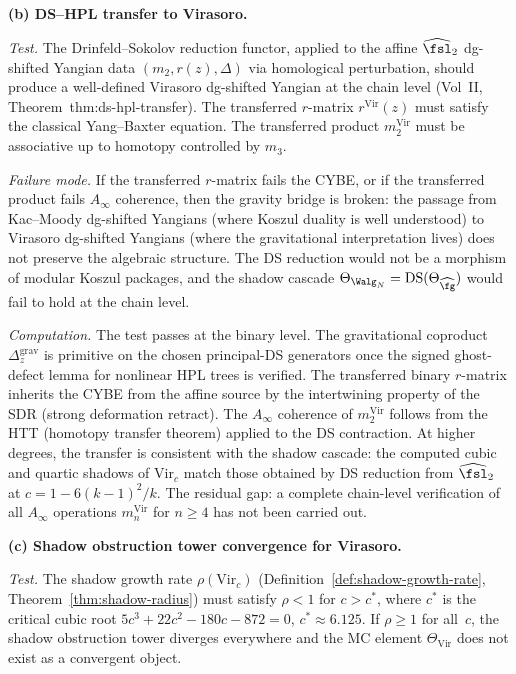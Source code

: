 \medskip
\noindent
\textbf{(b) DS--HPL transfer to Virasoro.}

\smallskip\noindent
\emph{Test.}\enspace
The Drinfeld--Sokolov reduction functor, applied to the
affine $\widehat{\fsl}_2$ dg-shifted Yangian data
$(m_2, r(z), \Delta)$ via homological perturbation,
should produce a well-defined Virasoro dg-shifted Yangian
at the chain level
(Vol~II, Theorem~\textup{thm:ds-hpl-transfer}).
The transferred $r$-matrix $r^{\mathrm{Vir}}(z)$
must satisfy the classical Yang--Baxter equation.
The transferred product $m_2^{\mathrm{Vir}}$ must
be associative up to homotopy controlled by $m_3$.

\smallskip\noindent
\emph{Failure mode.}\enspace
If the transferred $r$-matrix fails the CYBE, or if
the transferred product fails $A_\infty$ coherence,
then the gravity bridge is broken:
the passage from Kac--Moody dg-shifted Yangians
(where Koszul duality is well understood)
to Virasoro dg-shifted Yangians
(where the gravitational interpretation lives)
does not preserve the algebraic structure.
The DS reduction would not be a morphism of
modular Koszul packages, and the shadow cascade
$\Theta_{\Walg_N} = \mathrm{DS}(\Theta_{\widehat{\fg}})$
would fail to hold at the chain level.

\smallskip\noindent
\emph{Computation.}\enspace
The test passes at the binary level.
The gravitational coproduct \(\Delta_z^{\mathrm{grav}}\) is primitive
on the chosen principal-DS generators once the signed ghost-defect
lemma for nonlinear HPL trees is verified. The transferred binary
\(r\)-matrix
inherits the CYBE from the affine source by the
intertwining property of the SDR
(strong deformation retract).
The $A_\infty$ coherence of $m_2^{\mathrm{Vir}}$
follows from the HTT (homotopy transfer theorem)
applied to the DS contraction.
At higher degrees, the transfer is consistent
with the shadow cascade: the computed cubic and
quartic shadows of $\mathrm{Vir}_c$ match
those obtained by DS reduction from $\widehat{\fsl}_2$
at $c = 1 - 6(k-1)^2/k$.
The residual gap: a complete chain-level verification
of all $A_\infty$ operations $m_n^{\mathrm{Vir}}$
for $n \geq 4$ has not been carried out.

\medskip
\noindent
\textbf{(c) Shadow obstruction tower convergence for Virasoro.}

\smallskip\noindent
\emph{Test.}\enspace
The shadow growth rate
$\rho(\mathrm{Vir}_c)$
(Definition~\ref{def:shadow-growth-rate},
Theorem~\ref{thm:shadow-radius})
must satisfy $\rho < 1$ for $c > c^*$,
where $c^*$ is the critical cubic root
$5c^3 + 22c^2 - 180c - 872 = 0$,
$c^* \approx 6.125$.
If $\rho \geq 1$ for all~$c$, the shadow obstruction tower
diverges everywhere and the MC element
$\Theta_{\mathrm{Vir}}$ does not exist as a
convergent object.

